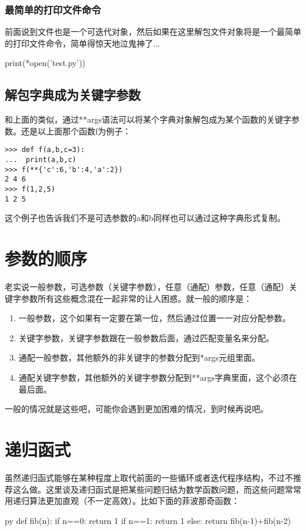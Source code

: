 \documentclass[12pt,oneside]{book}
\begin{document}
\begin{common-format}
\subsubsection{最简单的打印文件命令}
前面说到文件也是一个可迭代对象，然后如果在这里解包文件对象将是一个最简单的打印文件命令，简单得惊天地泣鬼神了...
\begin{tcbpython}[]
print(*open('test.py'))
\end{tcbpython}



\subsection{解包字典成为关键字参数}
和上面的类似，通过**args语法可以将某个字典对象解包成为某个函数的关键字参数。还是以上面那个函数f为例子：
\begin{Verbatim}
>>> def f(a,b,c=3):
...  print(a,b,c)
>>> f(**{'c':6,'b':4,'a':2})
2 4 6
>>> f(1,2,5)
1 2 5
\end{Verbatim}

这个例子也告诉我们不是可选参数的a和b同样也可以通过这种字典形式复制。


\section{参数的顺序}
老实说一般参数，可选参数（关键字参数），任意（通配）参数，任意（通配）关键字参数所有这些概念混在一起非常的让人困惑。就一般的顺序是：
\begin{enumerate}
\item 一般参数，这个如果有一定要在第一位，然后通过位置一一对应分配参数。
\item 关键字参数，关键字参数跟在一般参数后面，通过匹配变量名来分配。
\item 通配一般参数，其他额外的非关键字的参数分配到*args元组里面。
\item 通配关键字参数，其他额外的关键字参数分配到**args字典里面，这个必须在最后面。
\end{enumerate}
一般的情况就是这些吧，可能你会遇到更加困难的情况，到时候再说吧。



\section{递归函式}
\label{sec:递归函式}
虽然递归函式能够在某种程度上取代前面的一些循环或者迭代程序结构，不过不推荐这么做。这里谈及递归函式是把某些问题归结为数学函数问题，而这些问题常常用递归算法更加直观（不一定高效）。比如下面的菲波那奇函数：
\begin{xverbatim}[129]{py}
def fib(n):
    if n==0:
        return 1
    if n==1:
        return 1
    else:
        return fib(n-1)+fib(n-2)
        

\end{xverbatim}
\end{common-format}
\end{document}
